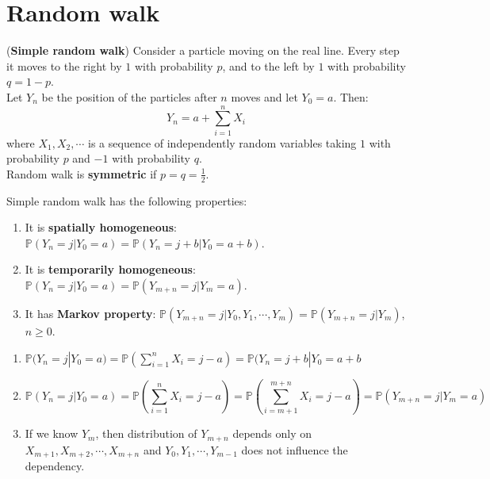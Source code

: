 \documentclass{huhtakm-template-book}
\newcommand{\prob}{\mathbb{P}}
\begin{document}
\appendix
\renewcommand{\thechapter}{\Alph{chapter}}

\chapter{Random walk}
\label{Appendix A Simple random walk}
\begin{eg}(\textbf{Simple random walk})
	Consider a particle moving on the real line. Every step it moves to the right by $1$ with probability $p$, and to the left by $1$ with probability $q=1-p$.\\
	Let $Y_{n}$ be the position of the particles after $n$ moves and let $Y_{0}=a$. Then:
	\begin{equation*}
		Y_{n}=a+\sum_{i=1}^{n}X_{i}
	\end{equation*}
	where $X_{1},X_{2},\cdots$ is a sequence of independently random variables taking $1$ with probability $p$ and $-1$ with probability $q$.\\
	Random walk is \textbf{symmetric} if $p=q=\frac{1}{2}$.
\end{eg}
\begin{lem}
	\label{Appendix A (Lemma) Simple random walk properties}
	Simple random walk has the following properties:
	\begin{enumerate}
		\item It is \textbf{spatially homogeneous}: $\prob(Y_{n}=j|Y_{0}=a)=\prob(Y_{n}=j+b|Y_{0}=a+b)$.
		\item It is \textbf{temporarily homogeneous}: $\prob(Y_{n}=j|Y_{0}=a)=\prob(Y_{m+n}=j|Y_{m}=a)$.
		\item It has \textbf{Markov property}: $\prob(Y_{m+n}=j|Y_{0},Y_{1},\cdots,Y_{m})=\prob(Y_{m+n}=j|Y_{m})$, $n\geq 0$.
	\end{enumerate}
\end{lem}
\begin{proofing}
	\begin{enumerate}
		\item $\prob(Y_{n}=j|Y_{0}=a)=\prob(\sum_{i=1}^{n}X_{i}=j-a)=\prob(Y_{n}=j+b|Y_{0}=a+b$
		\item 
		\begin{equation*}
			\prob(Y_{n}=j|Y_{0}=a)=\prob\left(\sum_{i=1}^{n}X_{i}=j-a\right)=\prob\left(\sum_{i=m+1}^{m+n}X_{i}=j-a\right)=\prob(Y_{m+n}=j|Y_{m}=a)
		\end{equation*}
		\item If we know $Y_{m}$, then distribution of $Y_{m+n}$ depends only on $X_{m+1},X_{m+2},\cdots,X_{m+n}$ and $Y_{0},Y_{1},\cdots,Y_{m-1}$ does not influence the dependency.
	\end{enumerate}
\end{proofing}
\end{document}
